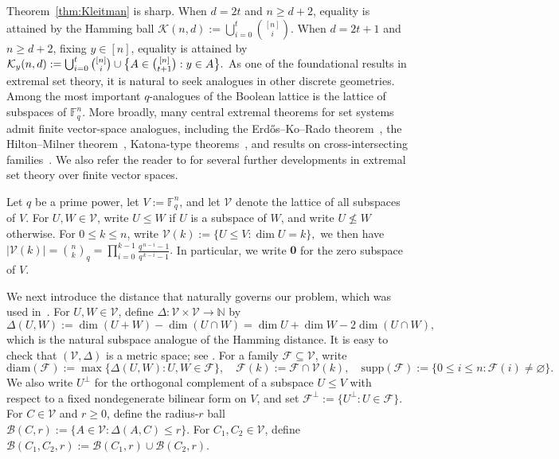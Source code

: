 \documentclass[11pt]{article}
\theoremstyle{definition}
\newcommand{\qbinom}[2]{\genfrac{(}{)}{0pt}{}{#1}{#2}_q}
\newcommand{\diam}{\mathrm{diam}}
\newcommand{\supp}{\mathrm{supp}}
\begin{document}
Theorem~\ref{thm:Kleitman} is sharp. When $d=2t$ and $n \geq d+2$, equality is attained by the Hamming ball
\(
\mathcal K(n,d):=\bigcup_{i=0}^{t}\binom{[n]}{i}.
\)
When $d=2t+1$ and $n \geq d+2$, fixing $y\in [n]$, equality is attained by
\(
\mathcal K_y(n,d):=
\bigcup_{i=0}^{t}\binom{[n]}{i}
\cup
\bigl\{A\in \tbinom{[n]}{t+1}: y\in A\bigr\}.
\)
As one of the foundational results in extremal set theory, it is natural to seek analogues in other discrete geometries. Among the most important $q$-analogues of the Boolean lattice is the lattice of subspaces of $\mathbb F_q^n$. More broadly, many central extremal theorems for set systems admit finite vector-space analogues, including the Erd\H{o}s--Ko--Rado theorem~\cite{FW1986,H1975}, the Hilton--Milner theorem~\cite{BBCFMPS2010}, Katona-type theorems~\cite{2013VectorKatona}, and results on cross-intersecting families~\cite{WZ2013}. We also refer the reader to
\cite{2023JCTACao,2022SIDMACao,2023DmShanZhou,2023GCShanZhou,2023JCTAWangXuZhang,2025JCTAYao}
for several further developments in extremal set theory over finite vector spaces.

Let $q$ be a prime power, let $V:=\mathbb F_q^n$, and let $\mathcal V$ denote the lattice of all subspaces of $V$. For $U,W\in\mathcal{V}$, write $U\le W$ if $U$ is a subspace of $W$, and write $U\not\le W$ otherwise. For $0\le k\le n$, write
\(
\mathcal V(k):=\{U\le V:\dim U=k\},\)
we then have
\(
|\mathcal V(k)|=\qbinom{n}{k}
=\prod_{i=0}^{k-1}\frac{q^{\,n-i}-1}{q^{\,k-i}-1}.
\)
In particular, we write \(\boldsymbol{0}\) for the zero subspace of \(V\).

We next introduce the distance that naturally governs our problem, which was used in~\cite{LLY2026}. For $U,W \in \mathcal{V}$, define $\Delta: \mathcal{V}\times \mathcal{V}\to \mathbb{N}$ by
\begin{equation*}
\Delta(U,W)
:=
\dim(U+W)-\dim(U\cap W)
=
\dim U+\dim W-2\dim(U\cap W),
\end{equation*}
which is the natural subspace analogue of the Hamming distance. It is easy to check that $(\mathcal{V}, \Delta)$ is a metric space; see \cite{LLY2026}.
For a family $\mathcal F\subseteq \mathcal V$, write
\[
\diam(\mathcal F):=\max\{\Delta(U,W):U,W\in\mathcal F\},
\quad
\mathcal F(k):=\mathcal F\cap \mathcal V(k),
\quad
\supp(\mathcal{F}) := \{ 0\le i\le n : \mathcal{F}(i) \neq \varnothing \}.
\]
We also write $U^\perp$ for the orthogonal complement of a subspace $U\le V$ with respect to a fixed nondegenerate bilinear form on $V$, and set
\(
\mathcal F^\perp:=\{U^\perp:U\in\mathcal F\}.
\)
For \(C\in\mathcal V\) and \(r\ge0\), define the radius-\(r\) ball
\(
\mathcal B(C,r):=\{A\in\mathcal V:\Delta(A,C)\le r\}.
\)
For \(C_1,C_2\in\mathcal V\), define
\(
\mathcal B(C_1,C_2,r):=\mathcal B(C_1,r)\cup \mathcal B(C_2,r).
\)
\end{document}
